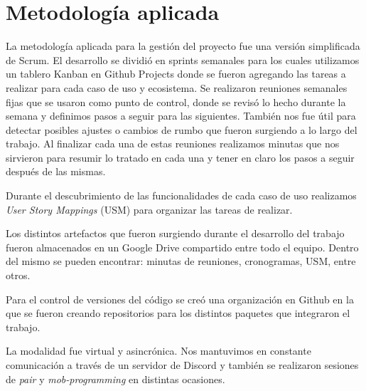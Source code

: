 \section{Metodología aplicada}

La metodología aplicada para la gestión del proyecto fue una versión simplificada de Scrum. El desarrollo se dividió en sprints semanales para los cuales utilizamos un tablero Kanban en Github Projects donde se fueron agregando las tareas a realizar para cada caso de uso y ecosistema. Se realizaron reuniones semanales fijas que se usaron como punto de control, donde se revisó lo hecho durante la semana y definimos pasos a seguir para las siguientes. También nos fue útil para detectar posibles ajustes o cambios de rumbo que fueron surgiendo a lo largo del trabajo. Al finalizar cada una de estas reuniones realizamos minutas que nos sirvieron para resumir lo tratado en cada una y tener en claro los pasos a seguir después de las mismas.

Durante el descubrimiento de las funcionalidades de cada caso de uso realizamos \textit{User Story Mappings} (USM) para organizar las tareas de realizar.

Los distintos artefactos que fueron surgiendo durante el desarrollo del trabajo fueron almacenados en un Google Drive compartido entre todo el equipo. Dentro del mismo se pueden encontrar: minutas de reuniones, cronogramas, USM, entre otros.

Para el control de versiones del código se creó una organización en Github en la que se fueron creando repositorios para los distintos paquetes que integraron el trabajo.

La modalidad fue virtual y asincrónica. Nos mantuvimos en constante comunicación a través de un servidor de Discord y también se realizaron sesiones de \textit{pair} y \textit{mob-programming} en distintas ocasiones.